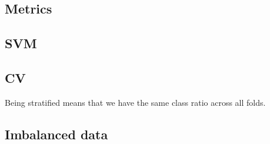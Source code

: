 \subsection{Metrics}
\subsection{SVM}
\subsection{CV}
Being stratified means that we have the same class ratio across all folds.
\subsection{Imbalanced data}